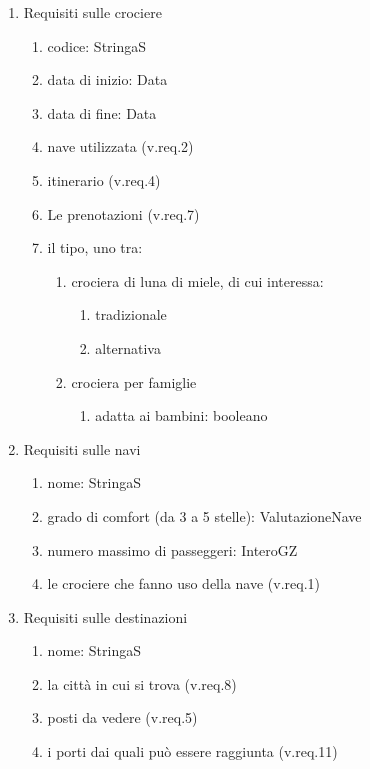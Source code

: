 \documentclass{article}
\begin{document}
\begin{enumerate}
    \item Requisiti sulle crociere
    \begin{enumerate}
        \item codice: StringaS
        \item data di inizio: Data
        \item data di fine: Data
        \item nave utilizzata (v.req.2)
        \item itinerario (v.req.4)
        \item Le prenotazioni (v.req.7)
        \item il tipo, uno tra:
        \begin{enumerate}
            \item crociera di luna di miele, di cui interessa:
            \begin{enumerate}
                \item tradizionale
                \item alternativa
            \end{enumerate}
            \item crociera per famiglie
            \begin{enumerate}
                \item adatta ai bambini: booleano
            \end{enumerate}
        \end{enumerate}
    \end{enumerate}
    \item Requisiti sulle navi
    \begin{enumerate}
        \item nome: StringaS
        \item grado di comfort (da 3 a 5 stelle): ValutazioneNave
        \item numero massimo di passeggeri: InteroGZ
        \item le crociere che fanno uso della nave (v.req.1)
    \end{enumerate}
    \item Requisiti sulle destinazioni
    \begin{enumerate}
        \item nome: StringaS
        \item la città in cui si trova (v.req.8)
        \item posti da vedere (v.req.5)
        \item i porti dai quali può essere raggiunta (v.req.11)

\end{enumerate}
\end{enumerate}
\end{document}
